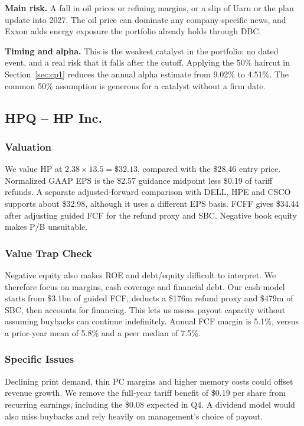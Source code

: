 \documentclass[10pt,a4paper]{article}
\begin{document}
\textbf{Main risk.} A fall in oil prices or refining margins, or a slip of Uaru or the plan update into 2027. The oil price can dominate any company-specific news, and Exxon adds energy exposure the portfolio already holds through DBC.

\textbf{Timing and alpha.} This is the weakest catalyst in the portfolio: no dated event, and a real risk that it falls after the cutoff. Applying the 50\% haircut in Section~\ref{sec:cp1} reduces the annual alpha estimate from 9.02\% to 4.51\%. The common 50\% assumption is generous for a catalyst without a firm date.

\subsection{HPQ -- HP Inc.}

\subsubsection*{Valuation}
We value HP at $2.38\times13.5=\$32.13$, compared with the \$28.46 entry price. Normalized GAAP EPS is the \$2.57 guidance midpoint less \$0.19 of tariff refunds. A separate adjusted-forward comparison with DELL, HPE and CSCO supports about \$32.98, although it uses a different EPS basis. FCFF gives \$34.44 after adjusting guided FCF for the refund proxy and SBC. Negative book equity makes P/B unsuitable.

\subsubsection*{Value Trap Check}
Negative equity also makes ROE and debt/equity difficult to interpret. We therefore focus on margins, cash coverage and financial debt. Our cash model starts from \$3.1bn of guided FCF, deducts a \$176m refund proxy and \$479m of SBC, then accounts for financing. This lets us assess payout capacity without assuming buybacks can continue indefinitely. Annual FCF margin is 5.1\%, versus a prior-year mean of 5.8\% and a peer median of 7.5\%.

\subsubsection*{Specific Issues}
Declining print demand, thin PC margins and higher memory costs could offset revenue growth. We remove the full-year tariff benefit of \$0.19 per share from recurring earnings, including the \$0.08 expected in Q4. A dividend model would also miss buybacks and rely heavily on management's choice of payout.
\end{document}
